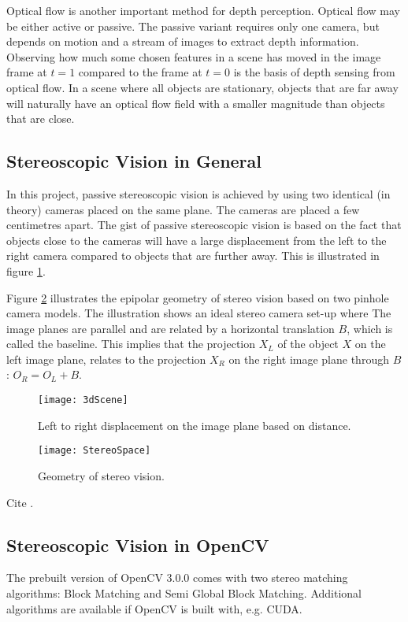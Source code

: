 Optical flow is another important method for depth perception. Optical flow may be either active or passive. The passive variant requires  only one camera, but depends on motion and a stream of images to extract depth information. Observing how much some chosen features in a scene has moved in the image frame at $t = 1$ compared to the frame at $t = 0$ is the basis of depth sensing from optical flow. In a scene where all objects are stationary, objects that are far away will naturally have an optical flow field with a smaller magnitude than objects that are close. 

\subsection{Stereoscopic Vision in General}

In this project, passive stereoscopic vision is achieved by using two identical (in theory) cameras placed on the same plane. The cameras are placed a few centimetres apart. The gist of passive stereoscopic vision is based on the fact that objects close to the cameras will have a large displacement from the left to the right camera compared to objects that are further away. This is illustrated in figure \ref{fig:3dScene}. 

Figure \ref{fig:StereoSpace} illustrates the epipolar geometry of stereo vision based on two pinhole camera models. The illustration shows an ideal stereo camera set-up where The image planes are parallel and are related by a horizontal translation $B$, which is called the baseline. This implies that the projection $X_L$ of the object $X$ on the left image plane, relates to the projection $X_R$ on the right image plane through $B$: $O_R = O_L + B$.

\begin{figure}
\centering
\texttt{[image: 3dScene]}
\caption{\label{fig:3dScene}Left to right displacement on the image plane based on distance.}
\end{figure}

\begin{figure}
\centering
\texttt{[image: StereoSpace]}
\caption{\label{fig:StereoSpace}Geometry of stereo vision.}
\end{figure}

Cite \cite{einstein}.

\subsection{Stereoscopic Vision in OpenCV}

The prebuilt version of OpenCV 3.0.0 comes with two stereo matching algorithms: Block Matching and Semi Global Block Matching. Additional algorithms are available if OpenCV is built with, e.g. CUDA.